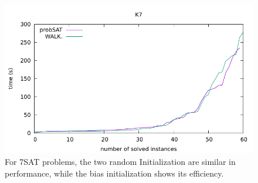 \documentclass[12pt,a4paper,twoside]{scrartcl}
\numberwithin{equation}{section}
\begin{document}
  \begin{figure}[H]
\begin{center}
  \includegraphics[scale = 1]{DATA/K7/e4w.pdf}
  \end{center}
  \caption{For 7SAT problems, the two random Initialization are similar in performance, while the bias initialization shows its efficiency.}
  \label{Experiment 7 k7-w cactus plot}
  \end{figure}
\end{document}
